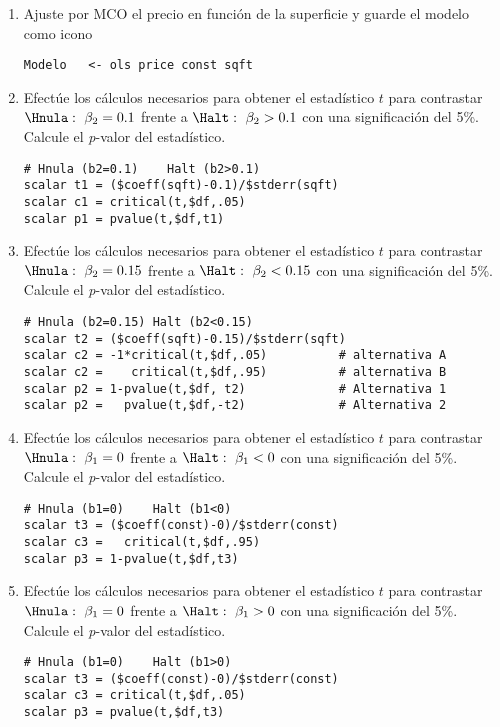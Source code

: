 \documentclass[11pt]{article}
\begin{document}
\begin{enumerate}
\item Ajuste por MCO el precio en función de la superficie y guarde el
modelo como icono
\begin{verbatim}
Modelo   <- ols price const sqft
\end{verbatim}

\item Efectúe los cálculos necesarios para obtener el estadístico \(t\)
para contrastar \(\Hnula:\ \beta_2=0.1\) frente a \(\Halt:\
   \beta_2>0.1\) con una significación del 5\%. Calcule el \emph{p}-valor
del estadístico.
\begin{verbatim}
# Hnula (b2=0.1)    Halt (b2>0.1)
scalar t1 = ($coeff(sqft)-0.1)/$stderr(sqft)
scalar c1 = critical(t,$df,.05)
scalar p1 = pvalue(t,$df,t1)    
\end{verbatim}

\item Efectúe los cálculos necesarios para obtener el estadístico \(t\)
para contrastar \(\Hnula:\ \beta_2=0.15\) frente a \(\Halt:\
   \beta_2<0.15\) con una significación del 5\%. Calcule el \emph{p}-valor
del estadístico.
\begin{verbatim}
# Hnula (b2=0.15) Halt (b2<0.15) 
scalar t2 = ($coeff(sqft)-0.15)/$stderr(sqft)
scalar c2 = -1*critical(t,$df,.05)          # alternativa A
scalar c2 =    critical(t,$df,.95)          # alternativa B
scalar p2 = 1-pvalue(t,$df, t2)             # Alternativa 1
scalar p2 =   pvalue(t,$df,-t2)             # Alternativa 2    
\end{verbatim}

\item Efectúe los cálculos necesarios para obtener el estadístico \(t\)
para contrastar \(\Hnula:\ \beta_1=0\) frente a \(\Halt:\ \beta_1<0\)
con una significación del 5\%. Calcule el \emph{p}-valor del
estadístico.
\begin{verbatim}
# Hnula (b1=0)    Halt (b1<0) 
scalar t3 = ($coeff(const)-0)/$stderr(const)
scalar c3 =   critical(t,$df,.95)
scalar p3 = 1-pvalue(t,$df,t3)
\end{verbatim}

\item Efectúe los cálculos necesarios para obtener el estadístico \(t\)
para contrastar \(\Hnula:\ \beta_1=0\) frente a \(\Halt:\ \beta_1>0\)
con una significación del 5\%. Calcule el \emph{p}-valor del
estadístico.
\begin{verbatim}
# Hnula (b1=0)    Halt (b1>0) 
scalar t3 = ($coeff(const)-0)/$stderr(const)
scalar c3 = critical(t,$df,.05)
scalar p3 = pvalue(t,$df,t3)
\end{verbatim}


\end{enumerate}
\end{document}
